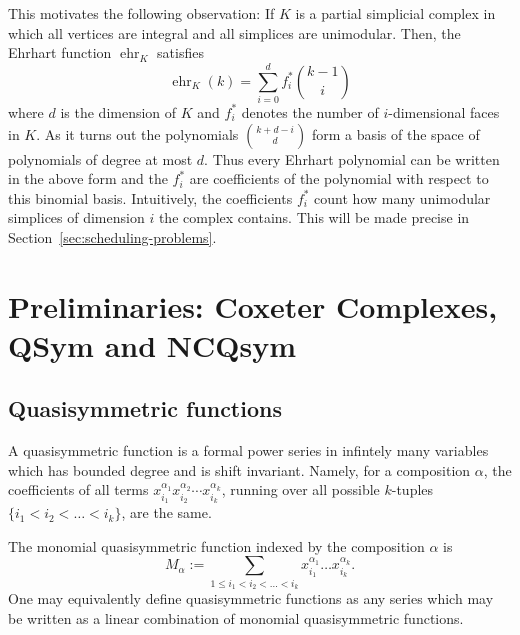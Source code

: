 \documentclass[12pt,reqno]{amsart}
\numberwithin{definition}{section}
\theoremstyle{definition}
\newcommand{\ehr}{\operatorname{ehr}}
\begin{document}
This motivates the following observation: If $K$ is a partial simplicial complex in which all vertices are integral and all simplices are unimodular. Then, the Ehrhart function $\ehr_K$ satisfies
\[
  \ehr_K(k) = \sum_{i=0}^d f_i^* \binom{k-1}{i}
\]
where $d$ is the dimension of $K$ and $f_i^*$ denotes the number of $i$-dimensional faces in $K$. As it turns out the polynomials $\binom{k+d-i}{d}$ form a basis of the space of polynomials of degree at most $d$. Thus every Ehrhart polynomial can be written in the above form and the $f_i^*$ are coefficients of the polynomial with respect to this binomial basis. Intuitively, the coefficients $f_i^*$ count how many unimodular simplices of dimension $i$ the complex contains. This will be made precise in Section~\ref{sec:scheduling-problems}.

\section{Preliminaries: Coxeter Complexes, QSym and NCQsym}
\label{sec:prelim-qsym}

\subsection{Quasisymmetric functions}
A quasisymmetric function is a formal power series in infintely many
variables which has bounded degree and is shift invariant.  Namely, for
a composition $\alpha$, the coefficients of all terms
$x_{i_1}^{\alpha_1}x_{i_2}^{\alpha_2} \cdots x_{i_k}^{\alpha_k}$,
running over all possible $k$-tuples $\{i_1 < i_2 < \ldots < i_k \}$, are
the same.


The monomial quasisymmetric function indexed by the composition $\alpha$ is 
$$M_{\alpha} := \sum_{1 \leq i_1 < i_2 < \ldots < i_k}
x_{i_1}^{\alpha_1} \ldots x_{i_k}^{\alpha_k}.$$  One may equivalently
define quasisymmetric functions as any series which may be written as a
linear combination of monomial quasisymmetric functions.



\end{document}
